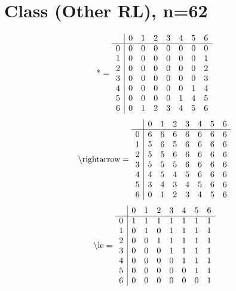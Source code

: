 \documentclass[11pt]{article}
\begin{document}
\section{Class (Other RL), n=62}
\[\text{*} = 
\begin{array}{r | r r r r r r r}
 & 0 & 1 & 2 & 3 & 4 & 5 & 6 \\ \hline
0 & 0 & 0 & 0 & 0 & 0 & 0 & 0 \\
1 & 0 & 0 & 0 & 0 & 0 & 0 & 1 \\
2 & 0 & 0 & 0 & 0 & 0 & 0 & 2 \\
3 & 0 & 0 & 0 & 0 & 0 & 0 & 3 \\
4 & 0 & 0 & 0 & 0 & 0 & 1 & 4 \\
5 & 0 & 0 & 0 & 0 & 1 & 4 & 5 \\
6 & 0 & 1 & 2 & 3 & 4 & 5 & 6 \\
\end{array}
\]
\[\text{\textbackslash rightarrow} = 
\begin{array}{r | r r r r r r r}
 & 0 & 1 & 2 & 3 & 4 & 5 & 6 \\ \hline
0 & 6 & 6 & 6 & 6 & 6 & 6 & 6 \\
1 & 5 & 6 & 5 & 6 & 6 & 6 & 6 \\
2 & 5 & 5 & 6 & 6 & 6 & 6 & 6 \\
3 & 5 & 5 & 5 & 6 & 6 & 6 & 6 \\
4 & 4 & 5 & 4 & 5 & 6 & 6 & 6 \\
5 & 3 & 4 & 3 & 4 & 5 & 6 & 6 \\
6 & 0 & 1 & 2 & 3 & 4 & 5 & 6 \\
\end{array}
\]
\[\text{\textbackslash le} = 
\begin{array}{r | r r r r r r r}
 & 0 & 1 & 2 & 3 & 4 & 5 & 6 \\ \hline
0 & 1 & 1 & 1 & 1 & 1 & 1 & 1 \\
1 & 0 & 1 & 0 & 1 & 1 & 1 & 1 \\
2 & 0 & 0 & 1 & 1 & 1 & 1 & 1 \\
3 & 0 & 0 & 0 & 1 & 1 & 1 & 1 \\
4 & 0 & 0 & 0 & 0 & 1 & 1 & 1 \\
5 & 0 & 0 & 0 & 0 & 0 & 1 & 1 \\
6 & 0 & 0 & 0 & 0 & 0 & 0 & 1 \\
\end{array}
\]
\end{document}
